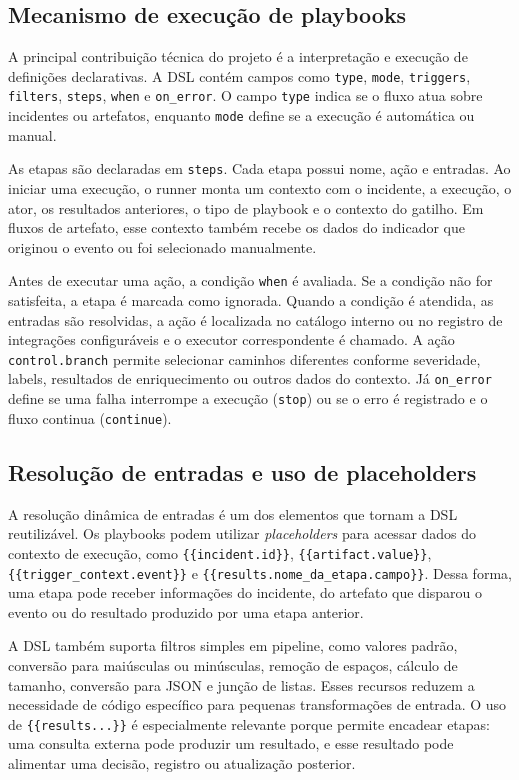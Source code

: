 \documentclass[article,a4paper,12pt,english,brazil,sumario=tradicional]{abntex2}
\begin{document}
\subsection{Mecanismo de execução de playbooks}

A principal contribuição técnica do projeto é a interpretação e execução de definições declarativas. A DSL contém campos como \texttt{type}, \texttt{mode}, \texttt{triggers}, \texttt{filters}, \texttt{steps}, \texttt{when} e \texttt{on\_error}. O campo \texttt{type} indica se o fluxo atua sobre incidentes ou artefatos, enquanto \texttt{mode} define se a execução é automática ou manual.

As etapas são declaradas em \texttt{steps}. Cada etapa possui nome, ação e entradas. Ao iniciar uma execução, o runner monta um contexto com o incidente, a execução, o ator, os resultados anteriores, o tipo de playbook e o contexto do gatilho. Em fluxos de artefato, esse contexto também recebe os dados do indicador que originou o evento ou foi selecionado manualmente.

Antes de executar uma ação, a condição \texttt{when} é avaliada. Se a condição não for satisfeita, a etapa é marcada como ignorada. Quando a condição é atendida, as entradas são resolvidas, a ação é localizada no catálogo interno ou no registro de integrações configuráveis e o executor correspondente é chamado. A ação \texttt{control.branch} permite selecionar caminhos diferentes conforme severidade, labels, resultados de enriquecimento ou outros dados do contexto. Já \texttt{on\_error} define se uma falha interrompe a execução (\texttt{stop}) ou se o erro é registrado e o fluxo continua (\texttt{continue}).

\subsection{Resolução de entradas e uso de placeholders}

A resolução dinâmica de entradas é um dos elementos que tornam a DSL reutilizável. Os playbooks podem utilizar \textit{placeholders} para acessar dados do contexto de execução, como \texttt{\{\{incident.id\}\}}, \texttt{\{\{artifact.value\}\}}, \texttt{\{\{trigger\_context.event\}\}} e \texttt{\{\{results.nome\_da\_etapa.campo\}\}}. Dessa forma, uma etapa pode receber informações do incidente, do artefato que disparou o evento ou do resultado produzido por uma etapa anterior.

A DSL também suporta filtros simples em pipeline, como valores padrão, conversão para maiúsculas ou minúsculas, remoção de espaços, cálculo de tamanho, conversão para JSON e junção de listas. Esses recursos reduzem a necessidade de código específico para pequenas transformações de entrada. O uso de \texttt{\{\{results...\}\}} é especialmente relevante porque permite encadear etapas: uma consulta externa pode produzir um resultado, e esse resultado pode alimentar uma decisão, registro ou atualização posterior.
\end{document}
